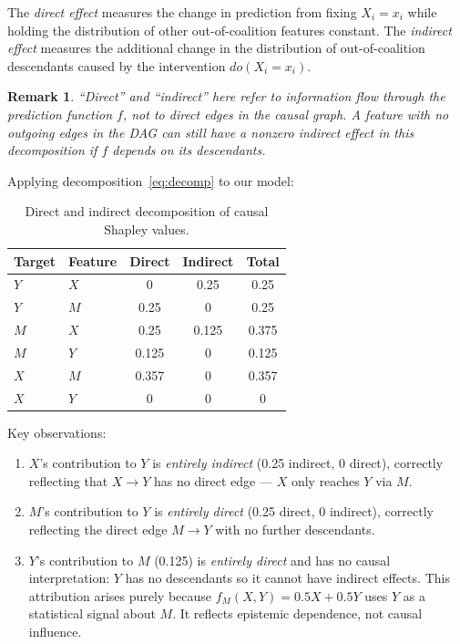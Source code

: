 \documentclass[12pt]{article}
\newtheorem{remark}{Remark}
\begin{document}
The \emph{direct effect} measures the change in prediction from fixing $X_i = x_i$ while
holding the distribution of other out-of-coalition features constant. The \emph{indirect
effect} measures the additional change in the distribution of out-of-coalition descendants
caused by the intervention $do(X_i = x_i)$.

\begin{remark}
``Direct'' and ``indirect'' here refer to information flow through the prediction function
$f$, not to direct edges in the causal graph. A feature with no outgoing edges in the DAG
can still have a nonzero indirect effect in this decomposition if $f$ depends on its
descendants.
\end{remark}

Applying decomposition~\eqref{eq:decomp} to our model:

\begin{table}[h]
\centering
\begin{tabular}{llccc}
\toprule
Target & Feature & Direct & Indirect & Total \\
\midrule
$Y$ & $X$ & 0      & 0.25  & 0.25  \\
$Y$ & $M$ & 0.25   & 0     & 0.25  \\
$M$ & $X$ & 0.25   & 0.125 & 0.375 \\
$M$ & $Y$ & 0.125  & 0     & 0.125 \\
$X$ & $M$ & 0.357  & 0     & 0.357 \\
$X$ & $Y$ & 0      & 0     & 0     \\
\bottomrule
\end{tabular}
\caption{Direct and indirect decomposition of causal Shapley values.}
\end{table}

Key observations:
\begin{enumerate}
\item $X$'s contribution to $Y$ is \emph{entirely indirect} (0.25 indirect, 0 direct),
      correctly reflecting that $X \to Y$ has no direct edge --- $X$ only reaches $Y$ via $M$.
\item $M$'s contribution to $Y$ is \emph{entirely direct} (0.25 direct, 0 indirect),
      correctly reflecting the direct edge $M \to Y$ with no further descendants.
\item $Y$'s contribution to $M$ (0.125) is \emph{entirely direct} and has no causal
      interpretation: $Y$ has no descendants so it cannot have indirect effects. This
      attribution arises purely because $f_M(X,Y) = 0.5X + 0.5Y$ uses $Y$ as a
      statistical signal about $M$. It reflects epistemic dependence, not causal influence.
\end{enumerate}
\end{document}
